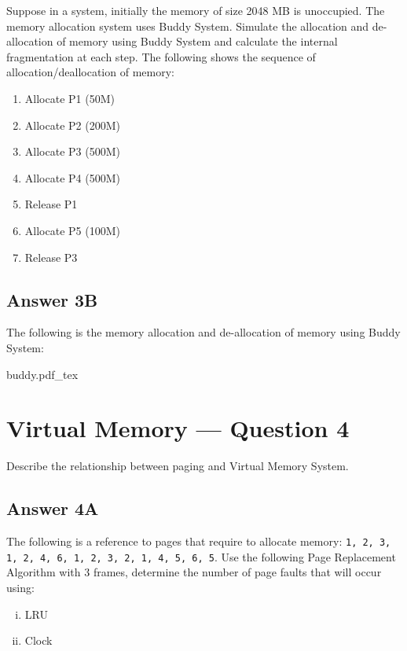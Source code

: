 \documentclass[
  11pt, %
]{assignment}
\newcommand{\incfig}[1]{%
    \def\svgwidth{\columnwidth}
    {#1.pdf_tex}
}
\begin{document}
\begin{problem} Suppose in a system, initially the memory of size 2048 MB is unoccupied. The memory allocation system uses Buddy System. Simulate the allocation and de- allocation of memory using Buddy System and calculate the internal fragmentation at each step. The following shows the sequence of allocation/deallocation of memory:
\begin{enumerate}
	\item Allocate P1 (50M)
	\item Allocate P2 (200M)
	\item Allocate P3 (500M)
	\item Allocate P4 (500M)
	\item Release P1
	\item Allocate P5 (100M)
	\item Release P3
\end{enumerate}
\end{problem}

\subsection*{Answer 3B}

The following is the memory allocation and de-allocation of memory using Buddy System:

\begin{center}
	\footnotesize
	\incfig{buddy}
\end{center}

\section*{Virtual Memory --- Question 4}

\begin{problem}
Describe the relationship between paging and Virtual Memory System.
\end{problem}

\subsection*{Answer 4A}

\begin{problem}
The following is a reference to pages that require to allocate memory: \texttt{1, 2, 3, 1, 2, 4, 6, 1, 2, 3, 2, 1, 4, 5, 6, 5}. Use the following Page Replacement Algorithm with 3 frames, determine the number of page faults that will occur using:
\begin{enumerate}[i.]
	\item LRU
	\item Clock
\end{enumerate}

\end{problem}
\end{document}
